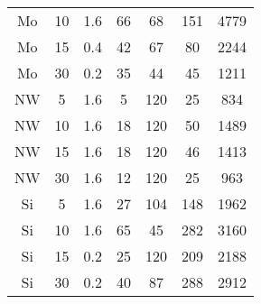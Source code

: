 \begin{table}[ht]
\begin{tabular}{ccccccc}
        Mo     & 10                        & 1.6                        & 66             & 68            & 151                     & 4779             \\
        Mo     & 15                        & 0.4                        & 42             & 67            & 80                      & 2244             \\
        Mo     & 30                        & 0.2                        & 35             & 44            & 45                      & 1211             \\
        NW     & 5                         & 1.6                        & 5              & 120           & 25                      & 834              \\
        NW     & 10                        & 1.6                        & 18             & 120           & 50                      & 1489             \\
        NW     & 15                        & 1.6                        & 18             & 120           & 46                      & 1413             \\
        NW     & 30                        & 1.6                        & 12             & 120           & 25                      & 963              \\
        Si     & 5                         & 1.6                        & 27             & 104           & 148                     & 1962             \\
        Si     & 10                        & 1.6                        & 65             & 45            & 282                     & 3160             \\
        Si     & 15                        & 0.2                        & 25             & 120           & 209                     & 2188             \\
        Si     & 30                        & 0.2                        & 40             & 87            & 288                     & 2912
    \end{tabular}
\end{table}